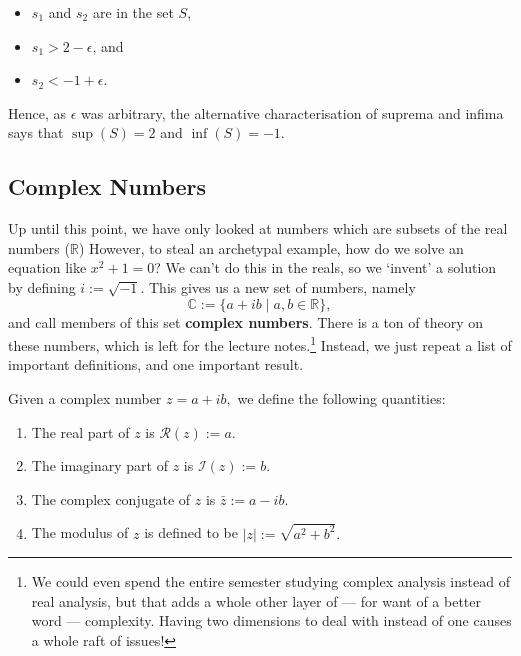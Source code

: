 \documentclass[
  10pt,
  a4paper]{article}
\providecommand{\tightlist}{%
  \setlength{\itemsep}{0pt}\setlength{\parskip}{0pt}}
\theoremstyle{plain}
\theoremstyle{definition}
\theoremstyle{plain}
\theoremstyle{plain}
\theoremstyle{plain}
\theoremstyle{plain}
\theoremstyle{definition}
\theoremstyle{definition}
\theoremstyle{remark}
\theoremstyle{remark}
\let\BeginKnitrBlock\begin \let\EndKnitrBlock\end
\begin{document}
\begin{itemize}
\tightlist
\item
  \(s_1\) and \(s_2\) are in the set \(S\),
\item
  \(s_1 > 2 - \epsilon\), and
\item
  \(s_2 < -1 + \epsilon\).
\end{itemize}

Hence, as \(\epsilon\) was arbitrary, the alternative characterisation of suprema and infima says that \(\sup(S) = 2\) and \(\inf(S) = -1\).

\hypertarget{complex-numbers}{%
\subsection{Complex Numbers}\label{complex-numbers}}

Up until this point, we have only looked at numbers which are subsets of the real numbers (\(\mathbb{R}\)) However, to steal an archetypal example, how do we solve an equation like \(x^2 + 1 = 0\)? We can't do this in the reals, so we `invent' a solution by defining \(i:=\sqrt{-1}.\) This gives us a new set of numbers, namely \[\mathbb{C}:= \lbrace a + ib \;\lvert\; a,b\in\mathbb{R}\rbrace,\] and call members of this set \textbf{complex numbers}. There is a ton of theory on these numbers, which is left for the lecture notes.\footnote{We could even spend the entire semester studying complex analysis instead of real analysis, but that adds a whole other layer of --- for want of a better word --- complexity. Having two dimensions to deal with instead of one causes a whole raft of issues!} Instead, we just repeat a list of important definitions, and one important result.

\BeginKnitrBlock{definition}[Complex Numbers]
{\label{def:def0} }Given a complex number \(z = a + ib,\) we define the following quantities:

\begin{enumerate}
\def\labelenumi{\roman{enumi})}
\tightlist
\item
  The real part of \(z\) is \(\mathcal{R}(z) := a.\)
\item
  The imaginary part of \(z\) is \(\mathcal{I}(z) := b.\)
\item
  The complex conjugate of \(z\) is \(\bar{z}:= a - ib.\)
\item
  The modulus of \(z\) is defined to be \(\lvert z \rvert := \sqrt{a^2 + b^2}.\)
\end{enumerate}
\EndKnitrBlock{definition}
\end{document}
